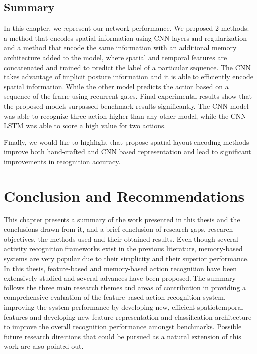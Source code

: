 \section{Summary}
In this chapter, we represent our network performance. We proposed 2 methods: a method that encodes spatial information using CNN layers and regularization and a method that encode the same information with an additional memory architecture added to the model, where spatial and temporal features are concatenated and trained to predict the label of a particular sequence.
The CNN takes advantage of implicit posture information and it is able to efficiently encode spatial information. While the other model predicts the action based on a sequence of the frame using recurrent gates.
Final experimental results show that the proposed models surpassed benchmark results significantly. The CNN model was able to recognize three action higher than any other model, while the CNN-LSTM was able to score a high value for two actions.

Finally, we would like to highlight that propose spatial layout encoding methods improve both hand-crafted and CNN based representation and lead to significant improvements in recognition accuracy.

\chapter{Conclusion and Recommendations}

This chapter presents a summary of the work presented in this thesis and the conclusions drawn from it, and a brief conclusion of research gaps, research objectives, the methods used and their obtained results. Even though several activity recognition frameworks exist in the previous literature, memory-based systems are very popular due to their simplicity and their superior performance. In this thesis, feature-based and memory-based action recognition have been extensively studied and several advances have been proposed. The summary follows the three main research themes and areas of contribution in providing a comprehensive evaluation of the feature-based action recognition system, improving the system performance by developing new, efficient spatiotemporal features and developing new feature representation and classification architecture to improve the overall recognition performance amongst benchmarks. Possible future research directions that could be pursued as a natural extension of this work are also pointed out. 

